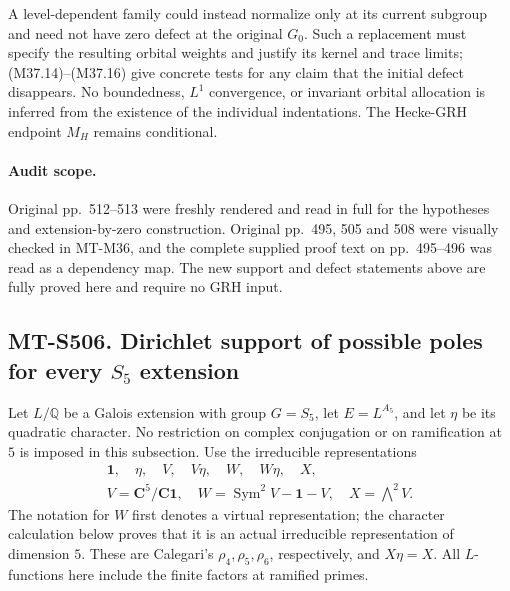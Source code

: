 A level-dependent family could instead normalize only
at its current subgroup and need not have zero defect
at the original $G_0$.  Such a replacement must specify
the resulting orbital weights and justify its kernel
and trace limits; (M37.14)--(M37.16) give concrete
tests for any claim that the initial defect disappears.
No boundedness, $L^1$ convergence, or invariant orbital
allocation is inferred from the existence of the
individual indentations.  The Hecke-GRH endpoint
$M_H$ remains conditional.

\paragraph{Audit scope.}
Original pp.~512--513 were freshly rendered and read
in full for the hypotheses and extension-by-zero
construction.  Original pp.~495, 505 and 508 were
visually checked in MT-M36, and the complete supplied
proof text on pp.~495--496 was read as a dependency
map.  The new support and defect statements above
are fully proved here and require no GRH input.


\subsection*{MT-S506. Dirichlet support of possible poles for every $S_5$ extension}

Let $L/\mathbb Q$ be a Galois extension with group $G=S_5$,
let $E=L^{A_5}$, and let $\eta$ be its quadratic character.
No restriction on complex conjugation or on ramification at $5$
is imposed in this subsection.  Use the irreducible representations
\[
 \begin{gathered}
 \mathbf1,\quad\eta,\quad V,\quad V\eta,\quad W,\quad W\eta,\quad X,\\
 V=\mathbf C^5/\mathbf C\mathbf1,\quad
 W=\operatorname{Sym}^2V-\mathbf1-V,\quad X=\bigwedge^2V.
 \end{gathered}
 \tag{S506.1}
\]
The notation for $W$ first denotes a virtual representation;
the character calculation below proves that it is an actual
irreducible representation of dimension $5$.  These are
Calegari's $\rho_4,\rho_5,\rho_6$, respectively, and $X\eta=X$.
All $L$-functions here include the finite factors at ramified primes.

